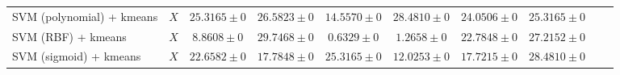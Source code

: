 \documentclass[twocolumn,10pt]{article}
\begin{document}
\begin{table*}[htb]
{\begin{tabular}{@{}lccccccccl@{}}
      SVM (polynomial) + kmeans & $X$        & $25.3165 \pm 0$                   & $26.5823 \pm 0$              & $14.5570 \pm 0$             & $28.4810 \pm 0$            & $24.0506 \pm 0$        & $25.3165 \pm 0$\\
      SVM (RBF) + kmeans        & $X$        & $8.8608 \pm 0$                    & $29.7468 \pm 0$              & $0.6329 \pm 0$              & $1.2658 \pm 0$             & $22.7848 \pm 0$        & $27.2152 \pm 0$\\
      SVM (sigmoid) + kmeans    & $X$        & $22.6582 \pm 0$                   & $17.7848 \pm 0$              & $25.3165 \pm 0$             & $12.0253 \pm 0$            & $17.7215 \pm 0$        & $28.4810 \pm 0$\\
      \bottomrule
      \end{tabular}
    }
    \label{table:Arrhythmia_result}
      \vspace{-\baselineskip}
  \end{table*}
\end{document}
